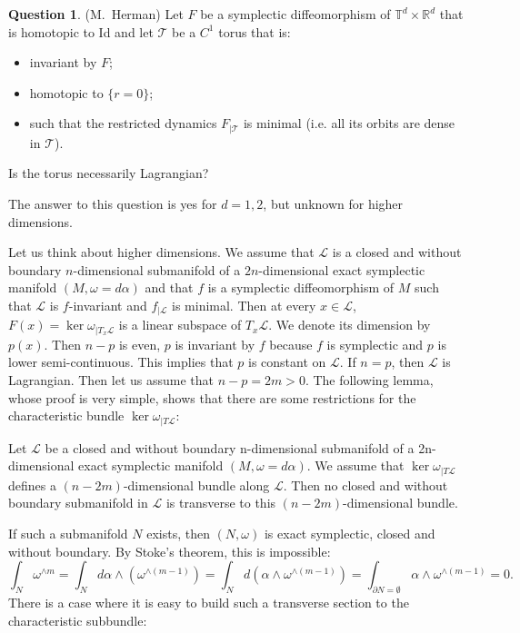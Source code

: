 \documentclass{dcds}
\theoremstyle{definition}
\newtheorem{ques}{Question}
\begin{document}
\begin{ques}\label{Q1} (M.~Herman) Let $F$ be a symplectic diffeomorphism of ${\mathbb {T}}^d\times {\mathbb {R}}^d
 $ that is homotopic to  Id  and let ${\mathcal {T}}$ be a $C^1$ torus that is:
\begin{itemize}
\item invariant by $F$;
\item  homotopic to $\{ r=0\}$;
\item such that the restricted dynamics $F_{|{\mathcal {T}}}$ is minimal (i.e. all its orbits are dense in ${\mathcal {T}}$).
\end{itemize}
 Is the torus necessarily Lagrangian?
\end{ques}
The answer to this question is yes for $d=1, 2$, but unknown for higher dimensions.

Let us think about higher dimensions. We assume that ${\mathcal {L}}$ is a closed and without boundary  $n$-dimensional submanifold of a $2n$-dimensional exact symplectic manifold  $(M, \omega=d\alpha)$ and that $f$ is a symplectic diffeomorphism of $M$ such that ${\mathcal {L}}$ is $f$-invariant and $f_{|{\mathcal {L}}}$ is minimal. Then at every $x\in{\mathcal {L}}$, $F(x)=\ker \omega_{|T_x{\mathcal {L}}}$ is a linear subspace of $T_x{\mathcal {L}}$. We denote its dimension by $p(x)$. Then $n-p$ is even, $p$ is invariant by $f$ because $f$ is symplectic and $p$ is lower semi-continuous. This implies that $p$ is constant on ${\mathcal {L}}$. If $n=p$, then ${\mathcal {L}}$ is Lagrangian. Then let us assume that $n-p=2m>0$. The following lemma, whose proof is very simple,  shows that there are some restrictions for the  characteristic bundle $\ker\omega_{|T{\mathcal {L}}}$:
 \begin{lem}
 Let ${\mathcal {L}}$ be a closed   and without boundary n-dimensional  submanifold of a 2n-dimensional exact symplectic manifold $(M,\omega=d\alpha)$. We assume that $\ker\omega_{|T{\mathcal {L}}}$ defines a $(n-2m)$-dimensional bundle along ${\mathcal {L}}$. Then no closed and without boundary submanifold  in ${\mathcal {L}}$ is transverse to this $(n-2m)$-dimensional bundle.
 \end{lem}
 If such a submanifold $N$ exists, then $(N, \omega)$ is exact symplectic, closed and without boundary. By Stoke's theorem, this is impossible:
$$ \int_N\omega^{\wedge m}=\int_Nd\alpha\wedge (\omega^{\wedge (m-1)})=\int_Nd(\alpha\wedge \omega^{\wedge (m-1)})=\int_{\partial N=\emptyset}\alpha\wedge \omega^{\wedge (m-1)}=0.$$
There is a case where it is easy to build such a transverse section to the characteristic subbundle:
\end{document}
